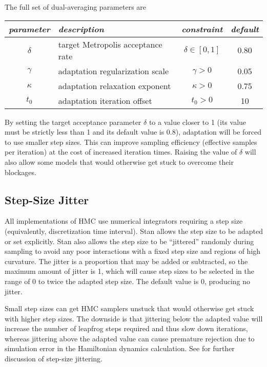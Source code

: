 The full set of dual-averaging parameters are
%
\begin{center}
\begin{tabular}{c|lcc}
{\it parameter} & {\it description} & {\it constraint} & {\it default}
\\ \hline
$\delta$ & target Metropolis acceptance rate 
         & $\delta \in [0,1]$ 
         & 0.80
\\
$\gamma$ & adaptation regularization scale
         & $\gamma > 0$
         & 0.05
\\
$\kappa$ & adaptation relaxation exponent
         & $\kappa > 0$
         & 0.75
\\
$t_0$    & adaptation iteration offset
         & $t_0 > 0$
         & 10
\end{tabular}
\end{center}
%
By setting the target acceptance parameter $\delta$ to a value closer
to 1 (its value must be strictly less than 1 and its default value is
0.8), adaptation will be forced to use smaller step sizes. This can
improve sampling efficiency (effective samples per iteration) at the
cost of increased iteration times. Raising the value of $\delta$ will
also allow some models that would otherwise get stuck to overcome
their blockages.

\subsection{Step-Size Jitter}

All implementations of HMC use numerical integrators requiring a step
size (equivalently, discretization time interval). Stan allows the
step size to be adapted or set explicitly. Stan also allows the step
size to be ``jittered'' randomly during sampling to avoid any poor
interactions with a fixed step size and regions of high curvature. The
jitter is a proportion that may be added or subtracted, so the maximum
amount of jitter is 1, which will cause step sizes to be selected in
the range of 0 to twice the adapted step size. The default value is 0,
producing no jitter.

Small step sizes can get HMC samplers unstuck that would otherwise get
stuck with higher step sizes. The downside is that jittering below the
adapted value will increase the number of leapfrog steps required and
thus slow down iterations, whereas jittering above the adapted value
can cause premature rejection due to simulation error in the
Hamiltonian dynamics calculation. See \citep{Neal:2011} for further
discussion of step-size jittering.


